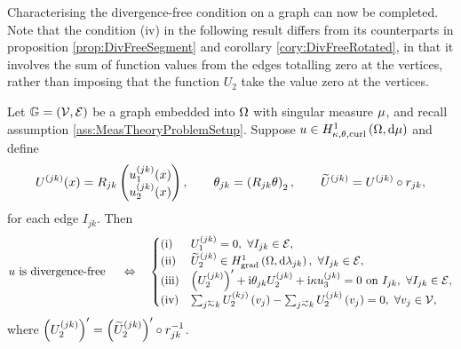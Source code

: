 Characterising the divergence-free condition on a graph can now be completed.
Note that the condition (iv) in the following result differs from its counterparts in proposition \ref{prop:DivFreeSegment} and corollary \ref{cory:DivFreeRotated}, in that it involves the sum of function values from the edges totalling zero at the vertices, rather than imposing that the function $U_2$ take the value zero at the vertices.
\begin{theorem} \label{thm:DivFreeEdgesCharacterisation}
	Let $\mathbb{G}=\left( \mathcal{V}, \mathcal{E} \right)$ be a graph embedded into $\Omega$ with singular measure $\mu$, and recall assumption \ref{ass:MeasTheoryProblemSetup}.
	Suppose $u\in H^1_{\kappa,\theta,\mathrm{curl}}\left( \Omega, \mathrm{d}\mu \right)$ and define
	\begin{align*}
		U^{(jk)}(x) = R_{jk}\begin{pmatrix} u_1^{(jk)}(x) \\ u_2^{(jk)}(x) \end{pmatrix},
		\qquad \theta_{jk} = \left(  R_{jk}\theta  \right)_2,
		\qquad \widetilde{U}^{(jk)} = U^{(jk)} \circ r_{jk},
	\end{align*}
	for each edge $I_{jk}$.
	Then
	\begin{align*}
		u \text{ is divergence-free } \quad\Leftrightarrow\quad
		\begin{cases}
			\mathrm{(i)} & U_1^{(jk)} = 0, \ \forall I_{jk}\in\edgeSet, \\
			\mathrm{(ii)} & \widetilde{U}_2^{(jk)} \in\gradSob{\ddom}{\lambda_{jk}}, \ \forall I_{jk}\in\edgeSet, \\
			\mathrm{(iii)} & \bracs{U_2^{(jk)}}' + \rmi\qm_{jk} U_2^{(jk)} + \rmi\wavenumber u_3^{(jk)} = 0 \text{ on } I_{jk}, \ \forall I_{jk}\in\edgeSet, \\
			\mathrm{(iv)} & \sum_{j\conRight k} U_2^{(kj)}\bracs{v_j} - \sum_{j\conLeft k} U_2^{(jk)}\bracs{v_j} = 0, \ \forall v_j\in\vertSet,
		\end{cases}
	\end{align*}
	where $\left( U_2^{(jk)} \right)' = \left( \widetilde{U}_2^{(jk)} \right)'\circ r_{jk}^{-1}$.
\end{theorem}
